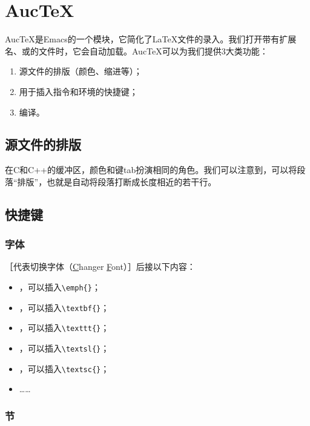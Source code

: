 \section{Auc\TeX }

Auc\TeX 是\textsf{Emacs}的一个模块，它简化了\LaTeX 文件的录入。我们打开带有扩展名、或的文件时，它会自动加载。Auc\TeX 可以为我们提供3大类功能：

\begin{enumerate}
    \item 源文件的排版（颜色、缩进等）；
    \item 用于插入指令和环境的快捷键；
    \item 编译。
\end{enumerate}

\subsection{源文件的排版}

在C和C++的缓冲区，颜色和键\textsf{tab}扮演相同的角色。我们可以注意到，可以将段落``排版''，也就是自动将段落打断成长度相近的若干行。

\subsection{快捷键}

\subsubsection{字体}

［代表切换字体（\underline{C}hanger \underline{F}ont）］后接以下内容：

\begin{itemize}
    \item {}，可以插入\verb+\emph{}+；
    \item {}，可以插入\verb+\textbf{}+；
    \item {}，可以插入\verb+\texttt{}+；
    \item {}，可以插入\verb+\textsl{}+；
    \item {}，可以插入\verb+\textsc{}+；
    \item ……
\end{itemize}

\subsubsection{节}


